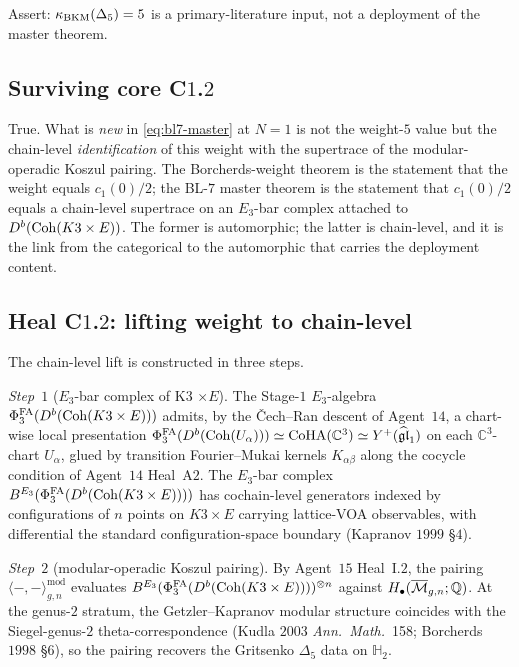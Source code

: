 Assert: $\kappa_{\mathrm{BKM}}(\Delta_5) = 5$ is a primary-literature input, not a
deployment of the master theorem.

\subsection*{Surviving core C$1$.$2$}

True. What is \emph{new} in \eqref{eq:bl7-master} at $N = 1$ is not the
weight-$5$ value but the chain-level \emph{identification} of this
weight with the supertrace of the modular-operadic Koszul pairing. The
Borcherds-weight theorem is the statement that the weight equals
$c_1(0)/2$; the BL-$7$ master theorem is the statement that $c_1(0)/2$
equals a chain-level supertrace on an $E_3$-bar complex attached to
$D^b(\mathrm{Coh}(K3 \times E))$. The former is automorphic; the latter is
chain-level, and it is the link from the categorical to the automorphic
that carries the deployment content.

\subsection*{Heal C$1$.$2$: lifting weight to chain-level}

The chain-level lift is constructed in three steps.

\emph{Step~$1$} ($E_3$-bar complex of K3 $\times E$). The Stage-$1$
$E_3$-algebra $\Phi^{\mathrm{FA}}_{3}(D^b(\mathrm{Coh}(K3 \times E)))$ admits, by the
\v{C}ech--Ran descent of Agent~$14$, a chart-wise local presentation
$\Phi^{\mathrm{FA}}_{3}(D^b(\mathrm{Coh}(U_\alpha))) \simeq \mathrm{CoHA}(\mathbb{C}^3) \simeq
Y^{+}(\widehat{\mathfrak{gl}}_1)$ on each $\mathbb{C}^3$-chart
$U_\alpha$, glued by transition Fourier--Mukai kernels $K_{\alpha\beta}$
along the cocycle condition of Agent~$14$ Heal~A$2$. The $E_3$-bar
complex $B^{E_{3}}(\Phi^{\mathrm{FA}}_{3}(D^b(\mathrm{Coh}(K3 \times E))))$ has cochain-level
generators indexed by configurations of $n$ points on $K3 \times E$
carrying lattice-VOA observables, with differential the standard
configuration-space boundary (Kapranov $1999$ \S$4$).

\emph{Step~$2$} (modular-operadic Koszul pairing). By Agent~$15$
Heal~I.$2$, the pairing
$\langle -, - \rangle^{\mathrm{mod}}_{g, n}$ evaluates
$B^{E_{3}}(\Phi^{\mathrm{FA}}_{3}(D^b(\mathrm{Coh}(K3 \times E))))^{\otimes n}$ against
$H_\bullet(\overline{\mathcal{M}}_{g, n}; \mathbb{Q})$. At the genus-$2$ stratum, the
Getzler--Kapranov modular structure coincides with the Siegel-genus-$2$
theta-correspondence (Kudla $2003$ \emph{Ann.~Math.}~158; Borcherds
$1998$ \S$6$), so the pairing recovers the Gritsenko $\Delta_5$ data
on $\mathbb{H}_2$.

